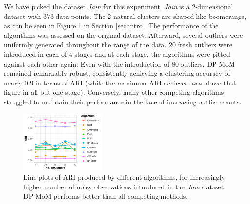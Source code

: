 \documentclass[12pt]{article}
\begin{document}
We have picked the dataset \textit{Jain} \cite{jain-dataset} for this experiment. \textit{Jain} is a $2$-dimensional dataset with $373$ data points. The $2$ natural clusters are shaped like boomerangs, as can be seen in Figure 1 in Section \ref{sec:intro}. The performance of the algorithms was assessed on the original dataset. Afterward, several outliers were uniformly generated throughout the range of the data. $20$ fresh outliers were introduced in each of $4$ stages and at each stage, the algorithms were pitted against each other again. Even with the introduction of $80$ outliers, DP-MoM remained remarkably robust, consistently achieving a clustering accuracy of nearly $0.9$ in terms of ARI  (while the maximum ARI achieved was above that figure in all but one stage). Conversely, many other competing algorithms struggled to maintain their performance in the face of increasing outlier counts. 

\begin{figure}[!htb]
    \centering
    \includegraphics[width=0.38\textwidth]{Diagrams/plot-ari-jain-light-0.6.png}
    \caption{Line plots of ARI produced by different algorithms, for increasingly higher number of noisy observations introduced in the \textit{Jain} dataset. DP-MoM performs better than all competing methods.}
    \label{fig:plot-jain-ari}
\end{figure}
\end{document}
